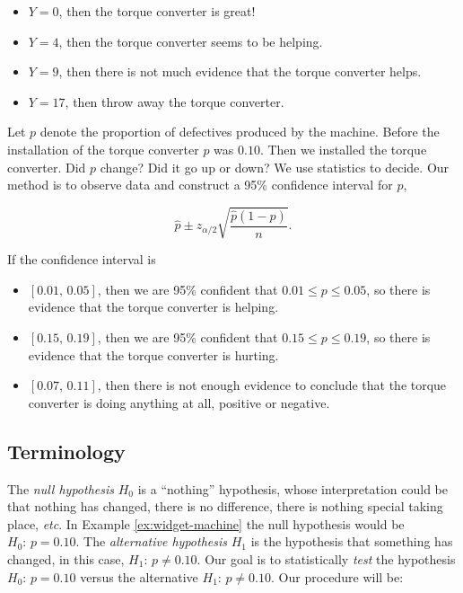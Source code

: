\documentclass[]{book}
\providecommand{\tightlist}{%
  \setlength{\itemsep}{0pt}\setlength{\parskip}{0pt}}
\numberwithin{equation}{chapter}
\numberwithin{figure}{chapter}
\theoremstyle{plain}
\theoremstyle{definition}
\theoremstyle{remark}
\theoremstyle{definition}
\theoremstyle{definition}
\theoremstyle{remark}
\begin{document}
\begin{itemize}
\tightlist
\item
  \(Y=0\), then the torque converter is great!
\item
  \(Y=4\), then the torque converter seems to be helping.
\item
  \(Y=9\), then there is not much evidence that the torque converter
  helps.
\item
  \(Y=17\), then throw away the torque converter.
\end{itemize}

Let \(p\) denote the proportion of defectives produced by the machine.
Before the installation of the torque converter \(p\) was \(0.10\). Then
we installed the torque converter. Did \(p\) change? Did it go up or
down? We use statistics to decide. Our method is to observe data and
construct a 95\% confidence interval for \(p\),

\begin{equation}
\hat{p} \pm z_{\alpha/2}\sqrt{\frac{\hat{p}(1 - \hat{p})}{n}}.
\end{equation}

If the confidence interval is

\begin{itemize}
\tightlist
\item
  \([0.01,\,0.05]\), then we are 95\% confident that
  \(0.01\leq  p \leq 0.05\), so there is evidence that the torque
  converter is helping.
\item
  \([0.15,\,0.19]\), then we are 95\% confident that
  \(0.15\leq  p \leq 0.19\), so there is evidence that the torque
  converter is hurting.
\item
  \([0.07,\,0.11]\), then there is not enough evidence to conclude that
  the torque converter is doing anything at all, positive or negative.
\end{itemize}

\subsection{Terminology}\label{terminology}

The \emph{null hypothesis} \(H_{0}\) is a ``nothing'' hypothesis, whose
interpretation could be that nothing has changed, there is no
difference, there is nothing special taking place, \emph{etc}. In
Example \ref{ex:widget-machine} the null hypothesis would be
\(H_{0}:\, p = 0.10.\) The \emph{alternative hypothesis} \(H_{1}\) is
the hypothesis that something has changed, in this case,
\(H_{1}:\, p \neq 0.10\). Our goal is to statistically \emph{test} the
hypothesis \(H_{0}:\, p = 0.10\) versus the alternative
\(H_{1}:\, p \neq 0.10\). Our procedure will be:
\end{document}
